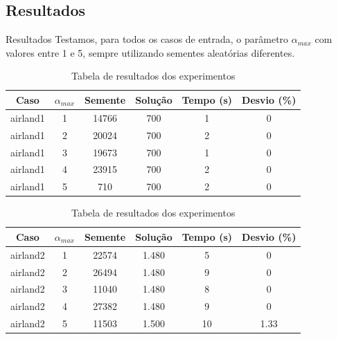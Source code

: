 \documentclass[xcolor=dvipsnames]{beamer}
\begin{document}
\subsection{Resultados}

\begin{frame}[allowframebreaks]{Resultados}
 Testamos, para todos os casos de entrada, o parâmetro $\alpha_{max}$ com valores entre 1 e 5, sempre utilizando sementes aleatórias diferentes.

\begin{table}

\centering

\caption{Tabela de resultados dos experimentos}

\begin{tabular}{|c|c|c|c|c|c|}

\hline %

Caso & $\alpha_{max}$ & Semente & Solução & Tempo (s) & Desvio (\%)  \\

\hline
airland1 & 1 & 14766 & 700 & 1 & 0 \\ 
airland1 & 2 & 20024 & 700 & 2 & 0 \\ 
airland1 & 3 & 19673 & 700 & 1 & 0 \\ 
airland1 & 4 & 23915 & 700 & 2 & 0 \\ 
airland1 & 5 & 710 & 700 & 2 & 0 \\ 
\hline

\end{tabular}
\label{tab}
\end{table} 

\begin{table}

\centering

\caption{Tabela de resultados dos experimentos}

\begin{tabular}{|c|c|c|c|c|c|}

\hline %

Caso & $\alpha_{max}$ & Semente & Solução & Tempo (s) & Desvio (\%)  \\


\hline
airland2 & 1 & 22574 & 1.480 & 5 & 0 \\ 
airland2 & 2 & 26494 & 1.480 & 9 & 0 \\ 
airland2 & 3 & 11040 & 1.480 & 8 & 0 \\ 
airland2 & 4 & 27382 & 1.480 & 9 & 0 \\ 
airland2 & 5 & 11503 & 1.500 & 10 & 1.33 \\ 
\hline


\end{tabular}
\end{table}
\end{frame}
\end{document}
